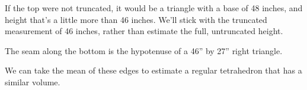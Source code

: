 \documentclass[letterpaper,10pt,english]{sphinxmanual}
\begin{document}
\sphinxAtStartPar
If the top were not truncated, it would be a triangle with a base of 48 inches, and height that’s a little more than 46 inches. We’ll stick with the truncated measurement of 46 inches, rather than estimate the full, untruncated height.

\begin{sphinxVerbatim}[commandchars=\\\{\}]
     
  
\end{sphinxVerbatim}

\sphinxAtStartPar
The seam along the bottom is the hypotenuse of a 46” by 27” right triangle.

\begin{sphinxVerbatim}[commandchars=\\\{\}]
    
\end{sphinxVerbatim}

\sphinxAtStartPar
We can take the mean of these edges to estimate a regular tetrahedron that has a similar volume.

\begin{sphinxVerbatim}[commandchars=\\\{\}]
            
\end{sphinxVerbatim}
\end{document}
